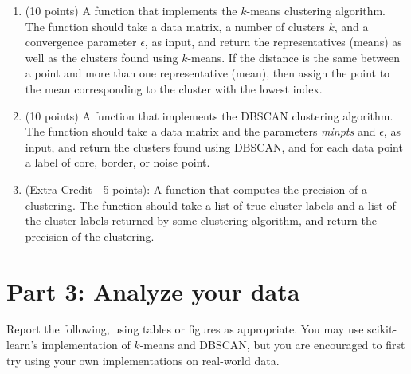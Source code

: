\documentclass[11pt]{article}
\begin{document}
\begin{enumerate}

    \item (10 points) A function that implements the $k$-means clustering
    algorithm. The function should take a data matrix, a number of clusters $k$,
    and a convergence parameter $\epsilon$, as input, and return the
    representatives (means) as well as the clusters found using $k$-means. If
    the distance is the same between a point and more than one representative
    (mean), then assign the point to the mean corresponding to the cluster with
    the lowest index.

    \item (10 points) A function that implements the DBSCAN clustering
    algorithm. The function should take a data matrix and the parameters
    \emph{minpts} and $\epsilon$, as input, and return the clusters found using
    DBSCAN, and for each data point a label of core, border, or noise point.

    \item (Extra Credit - 5 points): A function that computes the precision of a
    clustering. The function should take a list of true cluster labels and a
    list of the cluster labels returned by some clustering algorithm, and return
    the precision of the clustering.

\end{enumerate}

\section*{Part 3: Analyze your data}

Report the following, using tables or figures as appropriate. You may use
scikit-learn's implementation of $k$-means and DBSCAN, but you are encouraged to
first try using your own implementations on real-world data.
\end{document}
